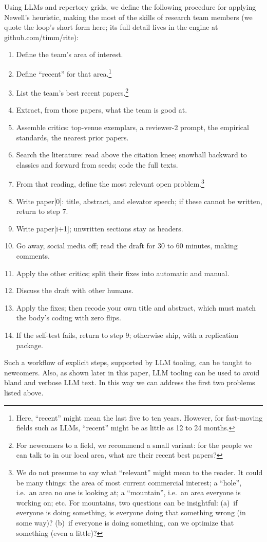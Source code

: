 Using LLMs and repertory grids, we define the following procedure
for applying Newell's heuristic, making the most of the skills of
research team members (we quote the loop's short form here; its
full detail lives in the engine at github.com/timm/rite):
\begin{enumerate}
\item Define the team's area of interest.
\item Define ``recent'' for that area.\footnote{Here, ``recent''
might mean the last five to ten years.
However, for fast-moving fields such as LLMs, ``recent'' might be
as little as 12 to 24 months.}
\item List the team's best recent papers.\footnote{For newcomers
to a field, we recommend a small variant: for the people we can
talk to in our local area, what are their recent best papers?}
\item Extract, from those papers, what the team is good at.
\item Assemble critics: top-venue exemplars, a reviewer-2 prompt,
the empirical standards, the nearest prior papers.
\item Search the literature: read above the citation knee;
snowball backward to classics and forward from seeds; code the
full texts.
\item From that reading, define the most relevant open
problem.\footnote{We do not presume to say what ``relevant''
might mean to the reader.
It could be many things: the area of most current commercial
interest; a ``hole'', i.e.\ an area no one is looking at; a
``mountain'', i.e.\ an area everyone is working on; etc.
For mountains, two questions can be insightful: (a)~if everyone
is doing something, is everyone doing that something wrong (in
some way)?
(b)~if everyone is doing something, can we optimize that
something (even a little)?}
\item Write {\ttfamily paper[0]}: title, abstract, and elevator
speech; if these cannot be written, return to step 7.
\item Write {\ttfamily paper[i+1]}; unwritten sections stay as
headers.
\item Go away, social media off; read the draft for 30 to 60
minutes, making comments.
\item Apply the other critics; split their fixes into automatic
and manual.
\item Discuss the draft with other humans.
\item Apply the fixes; then recode your own title and abstract,
which must match the body's coding with zero flips.
\item If the self-test fails, return to step 9; otherwise ship,
with a replication package.
\end{enumerate}
Such a workflow of explicit steps, supported by LLM tooling, can be
taught to newcomers.
Also, as shown later in this paper, LLM tooling can be used to avoid
bland and verbose LLM text.
In this way we can address the first two problems listed above.

